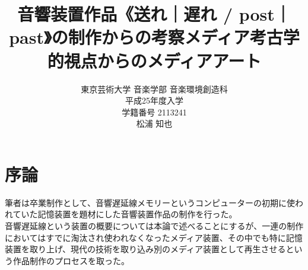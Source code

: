 \documentclass[a4paper,report]{jsbook}
\title{\Large 音響装置作品《送れ｜遅れ / post｜past》の制作からの考察\newline{\ddash}メディア考古学的視点からのメディアアート{\ddash}}
\author{東京芸術大学 音楽学部 音楽環境創造科\\平成25年度入学\\学籍番号 2113241\\松浦 知也}
\begin{document}
\maketitle

\tableofcontents

\makeatletter
\long{}
\makeatother

\makeatletter
\let\@oldmakecaption=\@makecaption
\let\oldthefigure=\thefigure
\let\oldtheHfigure=\theHfigure
\makeatother

\makeatletter
{}
\newenvironment{no-prefix-figure-caption}{
  \let\@makecaption=\@makenoprefixcaption
  \renewcommand\thefigure{x.\thefigno}
  \renewcommand\theHfigure{x.\thefigno}
  \stepcounter{figno}
}{
  \let\thefigure=\oldthefigure
  \let\theHfigure=\oldtheHfigure
  \let\@makecaption=\@oldmakecaption
  \addtocounter{figure}{-1}
}
\makeatother

\renewcommand{\figurename}{図}

\newcommand{\plusnamesingular}{}
\newcommand{\starnamesingular}{}
\newcommand{\xrefname}[1]{\protect\renewcommand{\plusnamesingular}{#1}}
\newcommand{\Xrefname}[1]{\protect\renewcommand{\starnamesingular}{#1}}
\providecommand{\cref}{\plusnamesingular~\ref}
\providecommand{\Cref}{\starnamesingular~\ref}
\providecommand{\crefformat}[2]{}
\providecommand{\Crefformat}[2]{}

\crefformat{figure}{図~#2#1#3}
\Crefformat{figure}{図~#2#1#3}

\chapter{序論}\label{ux5e8fux8ad6}

筆者は卒業制作として、音響遅延線メモリーというコンピューターの初期に使われていた記憶装置を題材にした音響装置作品の制作を行った。\\
音響遅延線という装置の概要については本論で述べることにするが、一連の制作においてはすでに淘汰され使われなくなったメディア装置、その中でも特に記憶装置を取り上げ、現代の技術を取り込み別のメディア装置として再生させるという作品制作のプロセスを取った。
\end{document}
